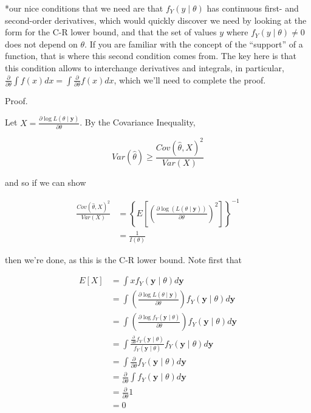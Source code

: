 \documentclass[
  letterpaper,
  DIV=11,
  numbers=noendperiod]{scrreprt}
\begin{document}
*our nice conditions that we need are that \(f_Y(y \mid \theta)\) has
continuous first- and second-order derivatives, which would quickly
discover we need by looking at the form for the C-R lower bound, and
that the set of values \(y\) where \(f_Y(y \mid \theta) \neq 0\) does
not depend on \(\theta\). If you are familiar with the concept of the
``support'' of a function, that is where this second condition comes
from. The key here is that this condition allows to interchange
derivatives and integrals, in particular,
\(\frac{\partial}{\partial \theta} \int f(x) dx = \int \frac{\partial}{\partial \theta} f(x)dx\),
which we'll need to complete the proof.

Proof.

Let
\(X = \frac{\partial \log L(\theta \mid \textbf{y})}{\partial \theta}\).
By the Covariance Inequality,

\[
Var(\hat{\theta}) \geq \frac{Cov(\hat{\theta},X)^2}{Var(X)}
\]

and so if we can show

\begin{align*} 
\frac{Cov(\hat{\theta},X)^2}{Var(X)} & = \left\{ E\left[ \left( \frac{\partial \log( L(\theta \mid \textbf{y}))}{\partial \theta}\right)^2\right]\right\}^{-1}  \\
& = \frac{1}{I(\theta)}
\end{align*}

then we're done, as this is the C-R lower bound. Note first that

\begin{align*} 
E[X] & = \int x f_Y(\textbf{y} \mid \theta) d\textbf{y} \\
& = \int \left( \frac{\partial \log L(\theta \mid \textbf{y})}{\partial \theta} \right)  f_Y(\textbf{y} \mid \theta) d\textbf{y} \\
& = \int \left( \frac{\partial \log f_Y(\textbf{y} \mid \theta)}{\partial \theta} \right)  f_Y(\textbf{y} \mid \theta) d\textbf{y} \\
& = \int \frac{\frac{\partial}{\partial \theta} f_Y(\textbf{y} \mid \theta)}{ f_Y(\textbf{y} \mid \theta)} f_Y(\textbf{y} \mid \theta) d\textbf{y} \\
& = \int \frac{\partial}{\partial \theta} f_Y (\textbf{y} \mid \theta) d\textbf{y} \\
& = \frac{\partial}{\partial \theta} \int f_Y(\textbf{y} \mid \theta) d\textbf{y} \\
& = \frac{\partial}{\partial \theta} 1 \\
& = 0
\end{align*}
\end{document}
